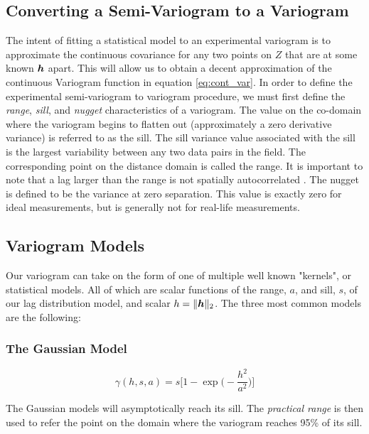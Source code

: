 \documentclass[11pt]{ucthesis}
\newcommand{\vect}[1]{{\it{\boldsymbol{#1}}}}
\begin{document}
\subsection{Converting a Semi-Variogram to a Variogram}
The intent of fitting a statistical model to an experimental variogram is to approximate the continuous covariance for any two points on $Z$ that are at some known $\vect{h}$ apart. This will allow us to obtain a decent approximation of the continuous Variogram function in equation \ref{eq:cont_var}. In order to define the experimental semi-variogram to variogram procedure, we must first define the \textit{range}, \textit{sill}, and \textit{nugget} characteristics of a variogram. The value on the co-domain where the variogram begins to flatten out (approximately a zero derivative variance) is referred to as the sill. The sill variance value associated with the sill is the largest variability between any two data pairs in the field. The corresponding point on the distance domain is called the range. It is important to note that a lag larger than the range is not spatially autocorrelated \cite{felus:srn}. The nugget is defined to be the variance at zero separation. This value is exactly zero for ideal measurements, but is generally not for real-life measurements.

\subsection{Variogram Models}
Our variogram can take on the form of one of multiple well known "kernels", or statistical models. All of which are scalar functions of the range, $a$, and sill, $s$, of our lag distribution model, and scalar $h = \|\vect{h}\|_2$. The three most common models are the following: %
\subsubsection{The Gaussian Model}

\begin{equation}
	\gamma(h, s, a) = s \Bigg[ 1 - \exp \Bigg( -\dfrac{h^2}{a^2} \Bigg) \Bigg]
	\label{eq:gauss_model}
\end{equation}

The Gaussian models will asymptotically reach its sill. The \textit{practical range} is then used to refer the point on the domain where the variogram reaches 95\% of its sill.
\end{document}
